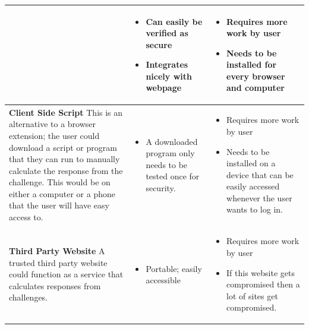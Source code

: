 \documentclass[11pt]{article}
\begin{document}
\begin{center}
\begin{tabular}{|  p{6cm} | p{5cm} | p{5cm} |}
    &
    \begin{itemize}[leftmargin=*]
    \item Can easily be verified as secure

    \item Integrates nicely with webpage
    \end{itemize}
    &
    \begin{itemize}[leftmargin=*]
    \item Requires more work by user

    \item Needs to be installed for every browser and computer
    \end{itemize}

    \\ \hline
    \vspace{.4cm}
    \textbf{Client Side Script}
    This is an alternative to a browser extension; the user could download a script or program that they can run to manually calculate the response from the challenge. This would be on either a computer or a phone that the user will have easy access to.

    &
    \begin{itemize}[leftmargin=*]
      \item A downloaded program only needs to be tested once for security.
    \end{itemize}

    &
    
    \begin{itemize}[leftmargin=*]
    \item Requires more work by user
    \item Needs to be installed on a device that can be easily accessed whenever the user wants to log in.
    \end{itemize}        

    \\ \hline
    \vspace{.4cm}
    \textbf{Third Party Website}
    A trusted third party website could function as a service that calculates responses from challenges.
    &

    \begin{itemize}[leftmargin=*]
      \item Portable; easily accessible
    \end{itemize}

    &

    \begin{itemize}[leftmargin=*]
      \item Requires more work by user
      \item If this website gets compromised then a lot of sites get compromised.
    \end{itemize}
    
    \\ \hline
    
    \end{tabular}
\end{center}
\end{document}
